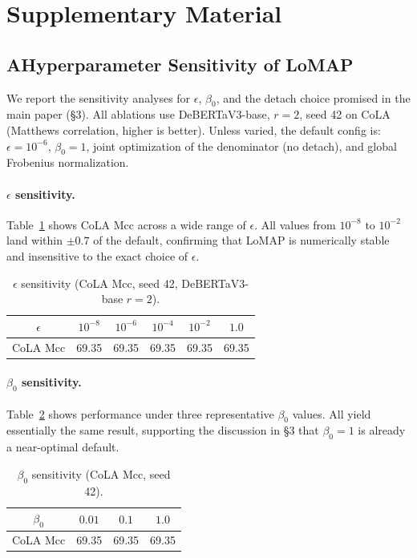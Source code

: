 \clearpage
\setcounter{page}{1}
\maketitlesupplementary

\section*{Supplementary Material}

\subsection*{A\quad Hyperparameter Sensitivity of LoMAP}

We report the sensitivity analyses for $\epsilon$, $\beta_0$, and the detach choice promised in the main paper (§3).
All ablations use DeBERTaV3-base, $r=2$, seed 42 on CoLA (Matthews correlation, higher is better).
Unless varied, the default config is: $\epsilon=10^{-6}$, $\beta_0=1$, joint optimization of the denominator (no detach), and global Frobenius normalization.

\paragraph{$\epsilon$ sensitivity.}
Table~\ref{tab:abl-eps} shows CoLA Mcc across a wide range of $\epsilon$.
All values from $10^{-8}$ to $10^{-2}$ land within $\pm0.7$ of the default, confirming that LoMAP is numerically stable and insensitive to the exact choice of $\epsilon$.

\begin{table}[h]
\centering
\caption{$\epsilon$ sensitivity (CoLA Mcc, seed 42, DeBERTaV3-base $r=2$).}
\setlength{\tabcolsep}{4mm}
\begin{tabular}{c|ccccc}
\toprule
$\epsilon$ & $10^{-8}$ & $10^{-6}$ & $10^{-4}$ & $10^{-2}$ & $1.0$ \\
\midrule
CoLA Mcc & 69.35 & 69.35 & 69.35 & 69.35 & 69.35 \\
\bottomrule
\end{tabular}
\label{tab:abl-eps}
\end{table}

\paragraph{$\beta_0$ sensitivity.}
Table~\ref{tab:abl-beta0} shows performance under three representative $\beta_0$ values.
All yield essentially the same result, supporting the discussion in §3 that $\beta_0=1$ is already a near-optimal default.

\begin{table}[h]
\centering
\caption{$\beta_0$ sensitivity (CoLA Mcc, seed 42).}
\setlength{\tabcolsep}{6mm}
\begin{tabular}{c|ccc}
\toprule
$\beta_0$ & $0.01$ & $0.1$ & $1.0$ \\
\midrule
CoLA Mcc & 69.35 & 69.35 & 69.35 \\
\bottomrule
\end{tabular}
\label{tab:abl-beta0}
\end{table}

